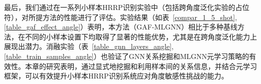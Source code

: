 最后，我们通过在一系列小样本HRRP识别实验中（包括跨角度泛化实验的占位符），对所提方法的性能进行了评估。实验结果（如表~\ref{compar_1_5_shot}, \ref{table_gaf_effect_angle}）表明，本方法（GAF-MLGNN）相比于多种基线方法，在不同的小样本设置下均取得了显著的性能优势，尤其是在跨角度泛化能力上展现出潜力。消融实验（表~\ref{table_gnn_layers_angle}, \ref{table_train_samples_angle}）也验证了GNN关系挖掘和MLGNN元学习策略的有效性。本章的研究表明，通过显式地挖掘和利用样本间的关系信息，并结合元学习框架，可以有效提升小样本HRRP识别系统应对角度敏感性挑战的能力。
